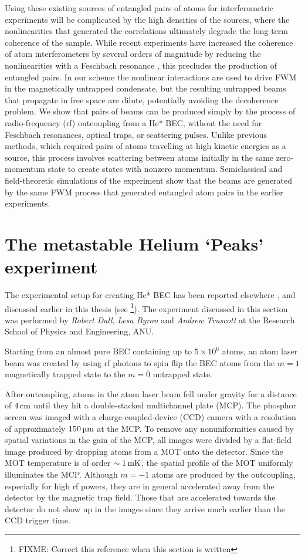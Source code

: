Using these existing sources of entangled pairs of atoms for interferometric experiments will be complicated by the high densities of the sources, where the nonlinearities that generated the correlations ultimately degrade the long-term coherence of the sample. While recent experiments have increased the coherence of atom interferometers by several orders of magnitude by reducing the nonlinearities with a Feschbach resonance \citep{Fattori:2008,Gustavsson:2008}, this precludes the production of entangled pairs. In our scheme the nonlinear interactions are used to drive FWM in the magnetically untrapped condensate, but the resulting untrapped beams that propagate in free space are dilute, potentially avoiding the decoherence problem. We show that pairs of beams can be produced simply by the process of radio-frequency (rf) outcoupling from a He* BEC, without the need for Feschbach resonances, optical traps, or scattering pulses. Unlike previous methods, which required pairs of atoms travelling at high kinetic energies as a source, this process involves scattering between atoms initially in the same zero-momentum state to create states with nonzero momentum. Semiclassical and field-theoretic simulations of the experiment show that the beams are generated by the same FWM process that generated entangled atom pairs in the earlier experiments.

\section{The metastable Helium `Peaks' experiment}
\label{Peaks:ExperimentalSetup}

The experimental setup for creating He* BEC has been reported elsewhere \citep{Dall:2007a}, and discussed earlier in this thesis (see \footnote{FIXME: Correct this reference when this section is written}). The experiment discussed in this section was performed by \emph{Robert Dall}, \emph{Lesa Byron} and \emph{Andrew Truscott} at the Research School of Physics and Engineering, ANU.

Starting from an almost pure BEC containing up to $5\times 10^6$ atoms, an atom laser beam was created by using rf photons to spin flip the BEC atoms from the $m=1$ magnetically trapped state to the $m=0$ untrapped state.

After outcoupling, atoms in the atom laser beam fell under gravity for a distance of $\unit[4]{cm}$ until they hit a double-stacked multichannel plate (MCP). The phosphor screen was imaged with a charge-coupled-device (CCD) camera with a resolution of approximately $\unit[150]{\micro m}$ at the MCP. To remove any nonuniformities caused by spatial variations in the gain of the MCP, all images were divided by a flat-field image produced by dropping atoms from a MOT onto the detector. Since the MOT temperature is of order $\sim\unit[1]{mK}$, the spatial profile of the MOT uniformly illuminates the MCP. Although $m=-1$ atoms are produced by the outcoupling, especially for high rf powers, they are in general accelerated away from the detector by the magnetic trap field. Those that are accelerated towards the detector do not show up in the images since they arrive much earlier than the CCD trigger time.

